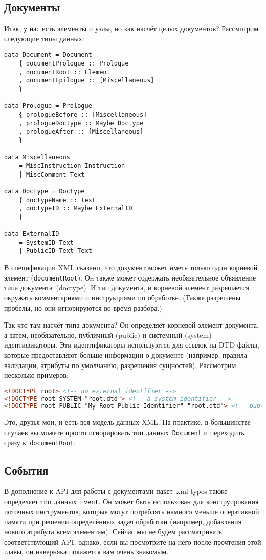\subsection{Документы}
Итак, у нас есть элементы и узлы, но как насчёт целых документов? Рассмотрим
следующие типы данных:
\begin{lstlisting}
data Document = Document
    { documentPrologue :: Prologue
    , documentRoot :: Element
    , documentEpilogue :: [Miscellaneous]
    }

data Prologue = Prologue
    { prologueBefore :: [Miscellaneous]
    , prologueDoctype :: Maybe Doctype
    , prologueAfter :: [Miscellaneous]
    }

data Miscellaneous
    = MiscInstruction Instruction
    | MiscComment Text

data Doctype = Doctype
    { doctypeName :: Text
    , doctypeID :: Maybe ExternalID
    }

data ExternalID
    = SystemID Text
    | PublicID Text Text
\end{lstlisting}

В спецификации XML сказано, что документ может иметь только один корневой
элемент (\lstinline!documentRoot!). Он также может содержать необязательное
объявление типа документа~(doctype). И тип документа, и корневой элемент
разрешается окружать комментариями и инструкциями по обработке. (Также
разрешены пробелы, но они игнорируются во время разбора.)

Так что там насчёт типа документа? Он определяет корневой элемент документа, а
затем, необязательно, публичный (public) и системный (system) идентификаторы.
Эти идентификаторы используются для ссылок на DTD-файлы, которые предоставляют
больше информации о документе (например, правила валидации, атрибуты по
умолчанию, разрешения сущностей). Рассмотрим несколько примеров:
\begin{lstlisting}[language=HTML]
<!DOCTYPE root> <!-- no external identifier -->
<!DOCTYPE root SYSTEM "root.dtd"> <!-- a system identifier -->
<!DOCTYPE root PUBLIC "My Root Public Identifier" "root.dtd"> <!-- public identifiers have a system ID as well -->
\end{lstlisting}

Это, друзья мои, и есть вся модель данных XML. На практике, в большинстве
случаев вы можете просто игнорировать тип данных~\lstinline!Document! и
переходить сразу к~\lstinline!documentRoot!.

\subsection{События} %
В дополнение к API для работы с документами пакет~xml-types также определяет
тип данных~\lstinline!Event!. Он может быть использован для конструирования
поточных инструментов, которые могут потреблять намного меньше оперативной
памяти при решении определённых задач обработки (например, добавления нового
атрибута всем элементам). Сейчас мы не будем рассматривать соответствующий API,
однако, если вы посмотрите на него после прочтения этой главы, он наверняка
покажется вам очень знакомым.

